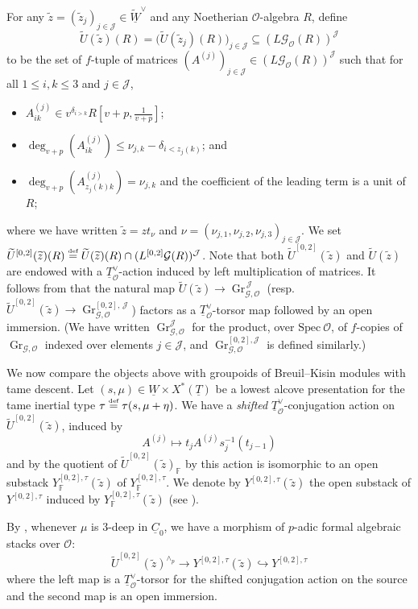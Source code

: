 \documentclass[oneside,a4paper,english, 11pt]{amsart}
\theoremstyle{plain}
\theoremstyle{plain}
\theoremstyle{plain}
\theoremstyle{plain}
\theoremstyle{plain}
\theoremstyle{plain}
\theoremstyle{definition}
\theoremstyle{definition}
\theoremstyle{definition}
\theoremstyle{remark}
\numberwithin{equation}{section}
\newcommand{\F}{\mathbb{F}}
\newcommand{\cG}{\mathcal{G}}
\newcommand{\cJ}{\mathcal{J}}
\newcommand{\cO}{\mathcal{O}}
\newcommand{\Spec}{\mathrm{Spec}\ }
\newcommand{\un}[1]{\underline{#1}}
\newcommand{\tld}[1]{\widetilde{#1}}
\newcommand{\defeq}{\stackrel{\textrm{\tiny{def}}}{=}}
\DeclareMathOperator{\Gr}{Gr}
\newcommand{\into}{\hookrightarrow}
\begin{document}
%
For any $\tld{z}=(\tld{z}_j)_{j\in\cJ}\in \tld{\un{W}}^{\vee}$ and any Noetherian $\cO$-algebra $R$, define 
\[
\tld{U}(\tld{z})(R)=\big(\tld{U}(\tld{z}_j)(R)\big)_{j\in\cJ}\subseteq (L\cG_{\cO}(R))^{\cJ}
\]
to be the set of $f$-tuple of matrices $(A^{(j)})_{j\in\cJ}\in (L\cG_{\cO}(R))^{\cJ}$ such that for all $1\leq i,k\leq 3$ and $j\in\cJ$,
\begin{itemize}
\item $A^{(j)}_{ik}\in v^{\delta_{i>k}}R\left[v+p, \frac{1}{v+p}\right]$; 
\item $\deg_{v+p}(A^{(j)}_{ik})\leq \nu_{j,k}-\delta_{i<z_j(k)}$; and
%
\item
$\deg_{v+p}(A^{(j)}_{z_j(k)k})=\nu_{j,k}$ and the coefficient of the leading term is a unit of $R$;
\end{itemize}
%
where we have written $\tld{z}=z t_\nu$ and $\nu=(\nu_{j,1},\nu_{j,2},\nu_{j,3})_{j\in \cJ}$.
We set $\tld{U}^{[0,2]}(\tld{z})(R)\defeq \tld{U}(\tld{z})(R)\cap (L^{[0,2]}\cG(R))^{\cJ}$.
Note that both $\tld{U}^{[0,2]}(\tld{z})$ and $\tld{U}(\tld{z})$ are endowed with a $\un{T}^{\vee}_{\cO}$-action induced by left multiplication of matrices. 
It follows from \cite[Lemmas 3.2.2 and 3.2.7]{MLM} that the natural map $\tld{U}(\tld{z})\rightarrow \Gr^{\,\cJ}_{\cG,\cO}$ (resp.~$\tld{U}^{[0,2]}(\tld{z})\rightarrow \Gr^{[0,2],\,\cJ}_{\cG,\cO}$) factors as a $\un{T}^{\vee}_{\cO}$-torsor map followed by an open immersion. 
(We have written $\Gr^{\cJ}_{\cG,\cO}$ for the product, over $\Spec \cO$, of $f$-copies of $\Gr_{\cG,\cO}$ indexed over elements $j\in\cJ$, and $\Gr^{[0,2],\cJ}_{\cG,\cO}$ is defined similarly.)

\vspace{3mm}

We now compare the objects above with groupoids of Breuil--Kisin modules with tame descent.
Let $(s,\mu)\in \un{W}\times X^*(\un{T})$ be a lowest alcove presentation for the tame inertial type $\tau\defeq \tau(s,\mu+\eta)$.
We have a \emph{shifted} $\un{T}_{\cO}^\vee$-conjugation action on $\tld{U}^{[0,2]}(\tld{z})$, induced by
\[
A^{(j)}\mapsto t_j A^{(j)} s^{-1}_j(t_{j-1})
\]
and by \cite[Corollary 5.2.3]{MLM} the quotient of $\tld{U}^{[0,2]}(\tld{z})_{\F}$ by this action is isomorphic to an open substack $Y^{[0,2],\tau}_{\F}(\tld{z})$ of $Y^{[0,2],\tau}_{\F}$.
We denote by $Y^{[0,2],\tau}(\tld{z})$ the open substack of $Y^{[0,2],\tau}$ induced by $Y^{[0,2],\tau}_{\F}(\tld{z})$ (see \cite[Definition 5.2.4]{MLM}).

By \cite[Theorem 5.3.1]{MLM}, whenever $\mu$ is $3$-deep in $\un{C}_0$, we have a morphism of $p$-adic formal algebraic stacks over $\cO$:
\[
\tld{U}^{[0,2]}(\tld{z})^{\wedge_p}\rightarrow  Y^{[0,2],\tau}(\tld{z})\into Y^{[0,2],\tau}
\]
where the left map is a $\un{T}^{\vee}_{\cO}$-torsor for the shifted conjugation action on the source and the second map is an open immersion.
\end{document}
